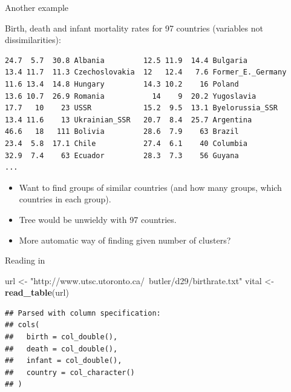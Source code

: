 \documentclass[
  ignorenonframetext,
]{beamer}
\newenvironment{Shaded}{\begin{snugshade}}{\end{snugshade}}
\newcommand{\KeywordTok}[1]{\textcolor[rgb]{0.13,0.29,0.53}{\textbf{#1}}}
\newcommand{\NormalTok}[1]{#1}
\newcommand{\StringTok}[1]{\textcolor[rgb]{0.31,0.60,0.02}{#1}}
\begin{document}
\begin{frame}[fragile]{Another example}
\protect\hypertarget{another-example}{}

Birth, death and infant mortality rates for 97 countries (variables not
dissimilarities):

\scriptsize

\begin{verbatim}
24.7  5.7  30.8 Albania         12.5 11.9  14.4 Bulgaria
13.4 11.7  11.3 Czechoslovakia  12   12.4   7.6 Former_E._Germany
11.6 13.4  14.8 Hungary         14.3 10.2    16 Poland
13.6 10.7  26.9 Romania           14    9  20.2 Yugoslavia
17.7   10    23 USSR            15.2  9.5  13.1 Byelorussia_SSR
13.4 11.6    13 Ukrainian_SSR   20.7  8.4  25.7 Argentina
46.6   18   111 Bolivia         28.6  7.9    63 Brazil
23.4  5.8  17.1 Chile           27.4  6.1    40 Columbia
32.9  7.4    63 Ecuador         28.3  7.3    56 Guyana
...
\end{verbatim}

\normalsize

\begin{itemize}
\item
  Want to find groups of similar countries (and how many groups, which
  countries in each group).
\item
  Tree would be unwieldy with 97 countries.
\item
  More automatic way of finding given number of clusters?
\end{itemize}

\end{frame}

\begin{frame}[fragile]{Reading in}
\protect\hypertarget{reading-in-2}{}

\begin{Shaded}
\begin{Highlighting}[]
\NormalTok{url <-}\StringTok{ "http://www.utsc.utoronto.ca/~butler/d29/birthrate.txt"}
\NormalTok{vital <-}\StringTok{ }\KeywordTok{read_table}\NormalTok{(url)}
\end{Highlighting}
\end{Shaded}

\begin{verbatim}
## Parsed with column specification:
## cols(
##   birth = col_double(),
##   death = col_double(),
##   infant = col_double(),
##   country = col_character()
## )
\end{verbatim}

\end{frame}
\end{document}
